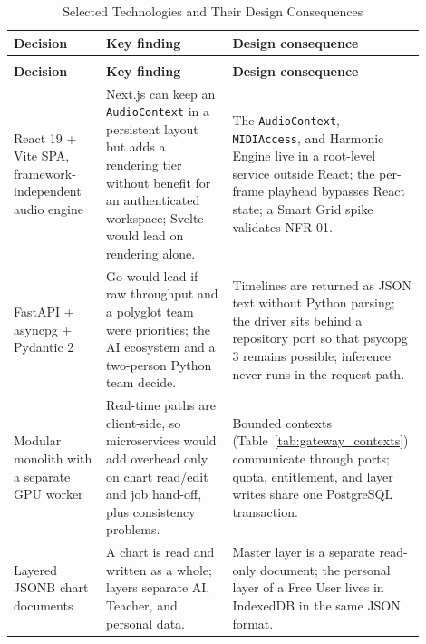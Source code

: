 \documentclass[a4paper]{article}
\begin{document}
\begin{longtable}{@{}
    >{\raggedright\arraybackslash}p{0.22\linewidth}
    >{\raggedright\arraybackslash}p{0.30\linewidth}
    >{\raggedright\arraybackslash}p{0.38\linewidth}@{}}

    \caption{Selected Technologies and Their Design Consequences}\label{tab:tech_consequences} \\
    \toprule
    \textbf{Decision} & \textbf{Key finding} & \textbf{Design consequence} \\
    \midrule
    \endfirsthead
    \multicolumn{3}{l}{\footnotesize\itshape (Table~\ref{tab:tech_consequences} continued)}\\
    \toprule
    \textbf{Decision} & \textbf{Key finding} & \textbf{Design consequence} \\
    \midrule
    \endhead
    \bottomrule
    \endlastfoot

    React 19 + Vite SPA, framework-independent audio engine & Next.js can keep an \texttt{AudioContext} in a persistent layout but adds a rendering tier without benefit for an authenticated workspace; Svelte would lead on rendering alone. & The \texttt{AudioContext}, \texttt{MIDIAccess}, and Harmonic Engine live in a root-level service outside React; the per-frame playhead bypasses React state; a Smart Grid spike validates NFR-01. \\
    \addlinespace
    FastAPI + asyncpg + Pydantic 2 & Go would lead if raw throughput and a polyglot team were priorities; the AI ecosystem and a two-person Python team decide. & Timelines are returned as JSON text without Python parsing; the driver sits behind a repository port so that psycopg 3 remains possible; inference never runs in the request path. \\
    \addlinespace
    Modular monolith with a separate GPU worker & Real-time paths are client-side, so microservices would add overhead only on chart read/edit and job hand-off, plus consistency problems. & Bounded contexts (Table~\ref{tab:gateway_contexts}) communicate through ports; quota, entitlement, and layer writes share one PostgreSQL transaction. \\
    \addlinespace
    Layered JSONB chart documents & A chart is read and written as a whole; layers separate AI, Teacher, and personal data. & Master layer is a separate read-only document; the personal layer of a Free User lives in IndexedDB in the same JSON format. \\
\end{longtable}
\end{document}
